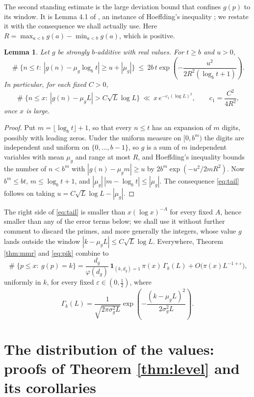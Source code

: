\documentclass[11pt,reqno]{amsart}
\theoremstyle{plain}
\newtheorem{lemma}[theorem]{Lemma}
\theoremstyle{definition}
\DeclareMathOperator{\Card}{\#}
\begin{document}
The second standing estimate is the large deviation bound that confines $g(p)$ to its window. It is Lemma 4.1 of \cite{vibefrtz}, an instance of Hoeffding's inequality \cite{hoeffding}; we restate it with the consequence we shall actually use. Here $R=\max_{a<b}g(a)-\min_{a<b}g(a)$, which is positive.

\begin{lemma}\label{lem:tail}
Let $g$ be strongly $b$-additive with real values. For $t\ge b$ and $u>0$,
\[
\Card\{n\le t:\ |g(n)-\mu_g\log_bt|\ge u+|\mu_g|\}\ \le\ 2b\,t\exp\left(-\frac{u^{2}}{2R^{2}(\log_bt+1)}\right).
\]
In particular, for each fixed $C>0$,
\begin{equation}\label{eq:tail}
\Card\{n\le x:\ |g(n)-\mu_gL|> C\sqrt L\log L\}\ \ll\ x\,e^{-c_1(\log L)^2},\qquad c_1=\frac{C^2}{4R^2},
\end{equation}
once $x$ is large.
\end{lemma}

\begin{proof}
Put $m=\lfloor\log_bt\rfloor+1$, so that every $n\le t$ has an expansion of $m$ digits, possibly with leading zeros. Under the uniform measure on $[0,b^m)$ the digits are independent and uniform on $\{0,\dots,b-1\}$, so $g$ is a sum of $m$ independent variables with mean $\mu_g$ and range at most $R$, and Hoeffding's inequality bounds the number of $n<b^m$ with $|g(n)-\mu_gm|\ge u$ by $2b^{m}\exp(-u^{2}/2mR^{2})$. Now $b^m\le bt$, $m\le\log_bt+1$, and $|\mu_g|\,|m-\log_bt|\le|\mu_g|$. The consequence \eqref{eq:tail} follows on taking $u=C\sqrt L\log L-|\mu_g|$.
\end{proof}

The right side of \eqref{eq:tail} is smaller than $x(\log x)^{-A}$ for every fixed $A$, hence smaller than any of the error terms below; we shall use it without further comment to discard the primes, and more generally the integers, whose value $g$ lands outside the window $|k-\mu_gL|\le C\sqrt L\log L$. Everywhere, Theorem \ref{thm:mmr} and \eqref{eq:pik} combine to
\begin{equation}\label{eq:mmr-clean}
\Card\{p\le x:\ g(p)=k\}
=\frac{d_g}{\varphi(d_g)}\,\mathbf 1_{(k,d_g)=1}\,\pi(x)\,\Gamma_k(L)
+O\big(\pi(x)L^{-1+\varepsilon}\big),
\end{equation}
uniformly in $k$, for every fixed $\varepsilon\in(0,\tfrac12)$, where
\[
\Gamma_k(L)=\frac{1}{\sqrt{2\pi\sigma_g^{2}L}}\exp\left(-\frac{(k-\mu_gL)^{2}}{2\sigma_g^{2}L}\right).
\]

\section{The distribution of the values: proofs of Theorem \ref{thm:level} and its corollaries}\label{sec:sieve}
\end{document}

